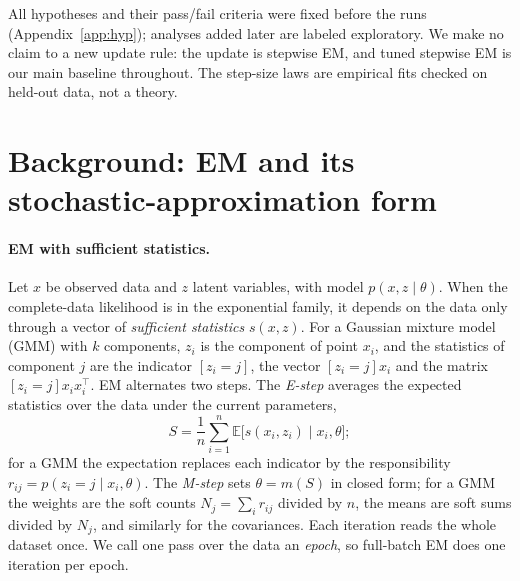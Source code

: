 \documentclass[10pt]{article}
\begin{document}
All hypotheses and their pass/fail criteria were fixed before the runs (Appendix~\ref{app:hyp}); analyses added later are
labeled exploratory. We make no claim to a new update rule: the update is stepwise EM, and tuned stepwise EM is our main
baseline throughout. The step-size laws are empirical fits checked on held-out data, not a theory.

\section{Background: EM and its stochastic-approximation form}\label{sec:background}

\paragraph{EM with sufficient statistics.} Let $x$ be observed data and $z$ latent variables, with model $p(x, z \mid
\theta)$. When the complete-data likelihood is in the exponential family, it depends on the data only through a
vector of \emph{sufficient statistics} $s(x, z)$. For a Gaussian mixture model (GMM) with $k$ components, $z_i$ is the
component of point $x_i$, and the statistics of component $j$ are the indicator $[z_i = j]$, the vector $[z_i = j]
x_i$ and the matrix $[z_i = j] x_i x_i^\top$. EM alternates two steps. The \emph{E-step} averages the expected
statistics over the data under the current parameters,
\begin{equation}
  S = \frac{1}{n}\sum_{i=1}^{n} \mathbb{E}\big[s(x_i, z_i) \mid x_i, \theta\big];
\end{equation}
for a GMM the expectation replaces each indicator by the responsibility $r_{ij} = p(z_i = j \mid x_i, \theta)$. The
\emph{M-step} sets $\theta = m(S)$ in closed form; for a GMM the weights are the soft counts $N_j = \sum_i r_{ij}$
divided by $n$, the means are soft sums divided by $N_j$, and similarly for the covariances. Each iteration reads the
whole dataset once. We call one pass over the data an \emph{epoch}, so full-batch EM does one iteration per epoch.
\end{document}
